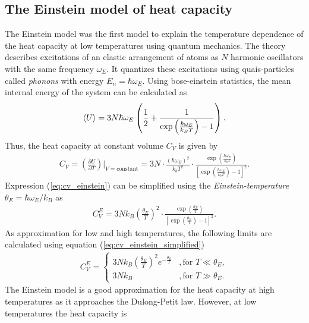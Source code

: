 \subsection{The Einstein model of heat capacity}
\label{sec:einstein}

The Einstein model was the first model to explain the temperature dependence of the heat capacity at low temperatures using quantum mechanics.
The theory describes excitations of an elastic arrangement of atoms as $N$ harmonic oscillators with the same frequency $\omega_E$.
It quantizes these excitations using quais-particles called \textit{phonons} with energy $E_n = \hbar\omega_E$.
Using bose-einstein statistics, the mean internal energy of the system can be calculated as
\begin{align}
    \braket U=3N\hbar\omega_E\left( \frac12+\frac1{\exp\left(\frac{\hbar\omega_E}{k_BT}\right)-1}\right).
    \label{eq:U_einstein}
\end{align}
Thus, the heat capacity at constant volume $C_V$ is given by
\begin{align}
    C_V=\left(\frac{\partial U}{\partial T}\right)\Big|_{V=\text{constant}} = 3N\cdot\frac{(\hbar\omega_E)^2}{k_bT^2}\cdot\frac{\exp\left(\frac{\hbar\omega_E}{k_bT}\right)}{\left[\exp\left(\frac{\hbar\omega_E}{k_bT}\right)-1\right]^2}.
    \label{eq:cv_einstein}
\end{align}
Expression (\ref{eq:cv_einstein}) can be simplified using the \textit{Einstein-temperature} $\theta_E=\hbar\omega_E/k_B$ as
\begin{align}
    C_V^E=3Nk_B\left(\frac{\theta_E}{T}\right)^2 \cdot 
    \frac{\exp\left(\frac{\theta_E}{T}\right)}{\left[\exp\left(\frac{\theta_E}{T}\right)-1\right]^2}.
    \label{eq:cv_einstein_simplified}
\end{align}
As approximation for low and high temperatures, the following limits are calculated using equation (\ref{eq:cv_einstein_simplified})
\begin{align}
    C_V^E=\begin{cases}
        3Nk_B\left(\frac{\theta_E}{T}\right)^2e^{-\frac{\theta_E}{T}} &,\text{for } T\ll\theta_E, \\
        3Nk_B &,\text{for } T\gg\theta_E.
        \end{cases}
    \label{eq:cv_einstein_limits}
\end{align}
The Einstein model is a good approximation for the heat capacity at high temperatures as it approaches the Dulong-Petit law.
However, at low temperatures the heat capacity is 
